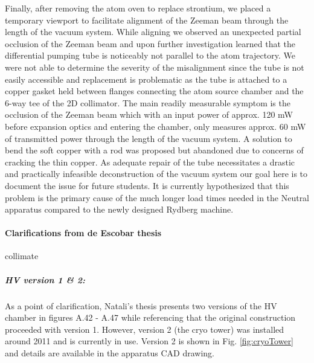 Finally, after removing the atom oven to replace strontium, we placed a temporary viewport to facilitate alignment of the Zeeman beam through the length of the vacuum system. 
While aligning we observed an unexpected partial occlusion of the Zeeman beam and upon further investigation learned that the differential pumping tube is noticeably not parallel to the atom trajectory.
We were not able to determine the severity of the misalignment since the tube is not easily accessible and replacement is problematic as the tube is attached to a copper gasket held between flanges connecting the atom source chamber and the 6-way tee of the 2D collimator. 
The main readily measurable symptom is the occlusion of the Zeeman beam which with an input power of approx. 120 mW before expansion optics and entering the chamber, only measures approx. 60 mW of transmitted power through the length of the vacuum system. 
A solution to bend the soft copper with a rod was proposed but abandoned due to concerns of cracking the thin copper.
As adequate repair of the tube necessitates a drastic and practically infeasible deconstruction of the vacuum system our goal here is to document the issue for future students.
It is currently hypothesized that this problem is the primary cause of the much longer load times needed in the Neutral apparatus compared to the newly designed Rydberg machine.

\paragraph{Clarifications from de Escobar thesis}

collimate 
\subparagraph{HV version 1 \& 2:}
As a point of clarification, Natali's thesis \cite{MartinezdeEscolar2010} presents two versions of the HV chamber in figures A.42 - A.47 while referencing that the original construction proceeded with version 1. 
However, version 2 (the cryo tower) was installed around 2011 and is currently in use. Version 2 is shown in Fig. \ref{fig:cryoTower} and details are available in the apparatus CAD drawing.

